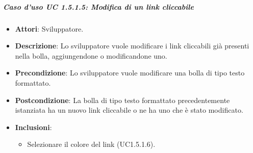 \subparagraph{Caso d'uso UC 1.5.1.5: Modifica di un link cliccabile}

\FloatBarrier
\begin{itemize}
\item\textbf{Attori}: Sviluppatore.
\item\textbf{Descrizione}: Lo sviluppatore vuole modificare i link cliccabili già presenti nella bolla, aggiungendone o modificandone uno.
\item\textbf{Precondizione}: Lo sviluppatore vuole modificare una bolla di tipo testo formattato.
\item\textbf{Postcondizione}: La bolla di tipo testo formattato precedentemente istanziata ha un nuovo link cliccabile o ne ha uno che è stato modificato.
\item\textbf{Inclusioni}: 
\begin{itemize}

\item Selezionare il colore del link (UC1.5.1.6).

\end{itemize}

\end{itemize}


